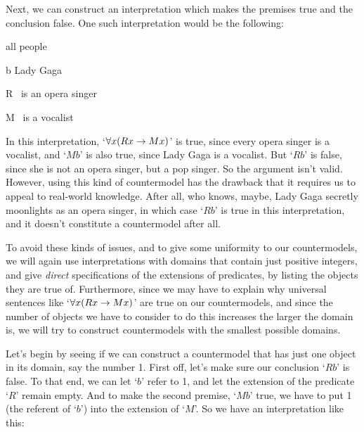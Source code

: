 \noindent Next, we can construct an interpretation which makes the premises true and the conclusion false.  One such interpretation would be the following:
\begin{ekey}
	\item[\text{Domain}] all people
	\item[b] Lady Gaga
	\item[R] \blank \ is an opera singer
	\item[M] \blank\ is a vocalist
\end{ekey}
In this interpretation, `$\forall x(Rx \rightarrow Mx)$' is  true, since every opera singer is a vocalist, and `$Mb$' is also true, since Lady Gaga is a vocalist.  But `$Rb$' is false, since she is not an opera singer, but a pop singer.  So the argument isn't valid.  However, using this kind of countermodel  has the drawback that it requires us to appeal to real-world knowledge.   After all, who knows, maybe, Lady Gaga secretly moonlights as an opera singer, in which case `$Rb$' is true in this interpretation, and it doesn't constitute a countermodel after all.

To avoid these kinds of issues, and to give some uniformity to our countermodels, we will again use interpretations with domains that contain just positive integers, and give \emph{direct} specifications of the extensions of predicates, by listing the objects they are true of.  Furthermore, since we may have to explain why universal sentences like `$\forall x(Rx \rightarrow Mx)$' are true on our countermodels, and since the number of objects we have to consider to do this increases the larger the domain is, we will  try to construct countermodels  with the smallest possible domains.

Let's begin by seeing if we can construct a countermodel that has just one object in its domain, say the number 1.  First off, let's make sure our conclusion `$Rb$' is false.  To that end, we can let `$b$' refer to 1, and let the extension of the predicate `$R$' remain empty.  And to make the second premise, `$Mb$' true, we have to put 1 (the referent of `$b$') into the extension of `$M$'.  So we have an interpretation like this:

